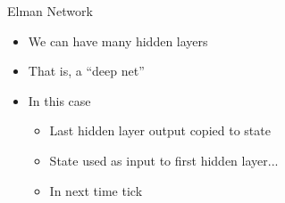 \documentclass[aspectratio=169]{beamer}
\begin{document}
\begin{frame}{Elman Network}

\begin{itemize}
	\item We can have many hidden layers
	\item That is, a ``deep net''
	\item In this case
	\begin{itemize}
		\item Last hidden layer output copied to state
		\item State used as input to first hidden layer...
		\item In next time tick
	\end{itemize}
\end{itemize}
\end{frame}
\end{document}

